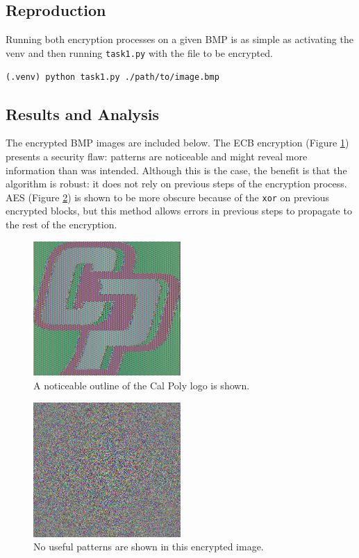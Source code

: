 \documentclass[11pt]{article}
\begin{document}
\subsection*{Reproduction}

Running both encryption processes on a given BMP is as simple as activating the venv and then running \verb|task1.py| with the file to be encrypted.

\verb|(.venv) python task1.py ./path/to/image.bmp|

\subsection*{Results and Analysis}

The encrypted BMP images are included below. The ECB encryption (Figure \ref{fig:ecb}) presents a security flaw: patterns are noticeable and might reveal more information than was intended. Although this is the case, the benefit is that the algorithm is robust: it does not rely on previous steps of the encryption process. AES (Figure \ref{fig:cbc}) is shown to be more obscure because of the \verb|xor| on previous encrypted blocks, but this method allows errors in previous steps to propagate to the rest of the encryption.

\begin{figure}[!ht]
	\centering
	\includegraphics[width=0.5\textwidth]{./assets/ecb_encrypted.jpg}
	\caption{A noticeable outline of the Cal Poly logo is shown.}
	\label{fig:ecb}
\end{figure}

\begin{figure}[!ht]
	\centering
	\includegraphics[width=0.5\textwidth]{./assets/cbc_encrypted.jpg}
	\caption{No useful patterns are shown in this encrypted image.}
	\label{fig:cbc}
\end{figure}
\end{document}
